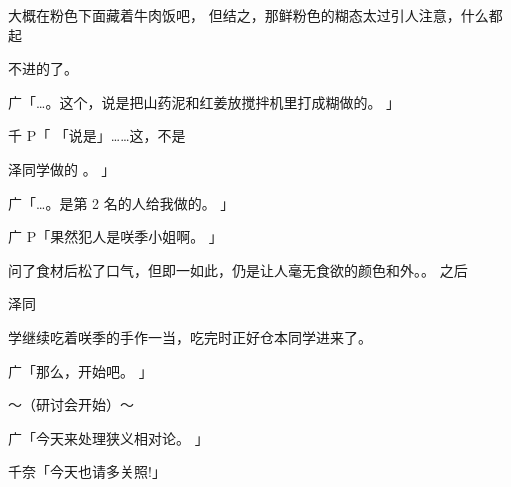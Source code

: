 大概在粉色下面藏着牛肉饭吧， 但结之，那鲜粉色的糊态太过引人注意，什么都起\par
不进的了。\par
广「…。这个，说是把山药泥和红姜放搅拌机里打成糊做的。 」\par
千 P「 「说是」……这，不是\par
泽同学做的 。 」\par
广「…。是第 2 名的人给我做的。 」\par
广 P「果然犯人是咲季小姐啊。 」\par
问了食材后松了口气，但即一如此，仍是让人毫无食欲的颜色和外。。 之后\par
泽同\par
学继续吃着咲季的手作一当，吃完时正好仓本同学进来了。\par
广「那么，开始吧。 」\par
～（研讨会开始）～\par
广「今天来处理狭义相对论。 」\par
千奈「今天也请多关照!」\par

